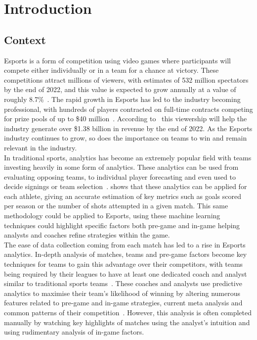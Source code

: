 \chapter{Introduction}\label{ch:introduction}

\section{Context}\label{sec:Context}

Esports is a form of competition using video games where participants will compete either individually or in a team for a chance at victory.
These competitions attract millions of viewers, with estimates of 532 million spectators by the end of 2022, and this value is expected to grow annually at a value of roughly 8.7\%~\citep{newzoo2022viewers}.
The rapid growth in Esports has led to the industry becoming professional, with hundreds of players contracted on full-time contracts competing for prize pools of up to \$40 million~\citep{esportsearnings}.
According to~\citet{newzoo2022viewers} this viewership will help the industry generate over \$1.38 billion in revenue by the end of 2022.
As the Esports industry continues to grow, so does the importance on teams to win and remain relevant in the industry.\\

In traditional sports, analytics has become an extremely popular field with teams investing heavily in some form of analytics.
These analytics can be used from evaluating opposing teams, to individual player forecasting and even used to decide signings or team selection~\citep{sarlis2020sports, apostolou2019sports}.
\citet{apostolou2019sports, sarlis2020sports} shows that these analytics can be applied for each athlete, giving an accurate estimation of key metrics such as goals scored per season or the number of shots attempted in a given match.
This same methodology could be applied to Esports, using these machine learning techniques could highlight specific factors both pre-game and in-game helping analysts and coaches refine strategies within the game.\\

The ease of data collection coming from each match has led to a rise in Esports analytics.
In-depth analysis of matches, teams and pre-game factors become key techniques for teams to gain this advantage over their competitors, with teams being required by their leagues to have at least one dedicated coach and analyst similar to traditional sports teams~\citep{LCSRules}.
These coaches and analysts use predictive analytics to maximise their team's likelihood of winning by altering numerous features related to pre-game and in-game strategies, current \gls{meta} analysis and common patterns of their competition~\citep{kokkinakis2021metagaming}.
However, this analysis is often completed manually by watching key highlights of matches using the analyst's intuition and using rudimentary analysis of in-game factors.\\

